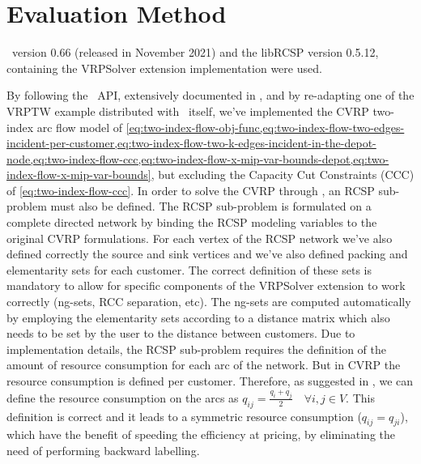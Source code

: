 \section{Evaluation Method}
\label{sec:results-evaluation-method}

\bapcod\ version 0.66 (released in November 2021) and the libRCSP version 0.5.12,
containing the VRPSolver extension implementation were used.

By following the \bapcod\ API, extensively documented in \textcite{sadykov2021},
and by re-adapting one of the VRPTW example distributed with \bapcod\ itself,
we've implemented the CVRP two-index arc flow model
of \cref{eq:two-index-flow-obj-func,eq:two-index-flow-two-edges-incident-per-customer,eq:two-index-flow-two-k-edges-incident-in-the-depot-node,eq:two-index-flow-ccc,eq:two-index-flow-x-mip-var-bounds-depot,eq:two-index-flow-x-mip-var-bounds},
but excluding the Capacity Cut Constraints (CCC) of \cref{eq:two-index-flow-ccc}.
In order to solve the CVRP through \bapcod, an RCSP sub-problem must also be defined.
The RCSP sub-problem is formulated on a complete directed network by
binding the RCSP modeling variables to the original CVRP formulations.
For each vertex of the RCSP network we've also defined correctly the source
and sink vertices and we've also defined packing and elementarity sets
for each customer.
The correct definition of these sets is mandatory to allow for specific
components of the VRPSolver extension to work correctly (ng-sets, RCC separation, etc).
The ng-sets are computed automatically by employing the elementarity sets
according to a distance matrix which also needs to be set by the user
to the distance between customers.
Due to implementation details, the RCSP sub-problem requires
the definition of the amount of resource consumption for each arc of the network.
But in CVRP the resource consumption is defined per customer.
Therefore, as suggested in \textcite{pessoa2020a}, we can define the resource consumption
on the arcs as $q_{ij} = \frac{q_{i} + q_{j}}{2} \quad \forall i, j \in V$.
This definition is correct and it leads to a symmetric resource consumption ($q_{ij} = q_{ji}$),
which have the benefit of speeding the efficiency at pricing,
by eliminating the need of performing backward labelling.

